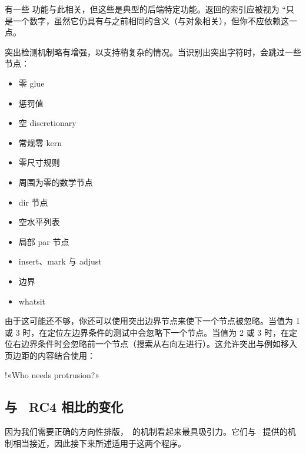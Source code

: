 有一些  功能与此相关，但这些是典型的后端特定功能。返回的索引应被视为 ``只是一个数字，虽然它仍具有与之前相同的含义（与对象相关），但你不应依赖这一点。

突出检测机制略有增强，以支持稍复杂的情况。当识别出突出字符时，会跳过一些节点：

\begin{itemize}
\item 零 glue 
\item 惩罚值 
\item 空 discretionary 
\item 常规零 kern 
\item 零尺寸规则 
\item 周围为零的数学节点 
\item dir 节点 
\item 空水平列表 
\item 局部 par 节点 
\item insert、mark 与 adjust 
\item 边界 
\item whatsit 
\end{itemize}

由于这可能还不够，你还可以使用突出边界节点来使下一个节点被忽略。当值为 1 或 3 时，在定位左边界条件的测试中会忽略下一个节点。当值为 2 或 3 时，在定位右边界条件时会忽略前一个节点（搜索从右向左进行）。这允许突出与例如移入页边距的内容结合使用：

\begin{typing}
!\quad«Who needs protrusion?»
\end{typing}

\subsection{与 \ALEPH\ RC4 相比的变化}

\topicindex {\ALEPH}

因为我们需要正确的方向性排版，\ALEPH\ 的机制看起来最具吸引力。它们与 \OMEGA\ 提供的机制相当接近，因此接下来所述适用于这两个程序。

